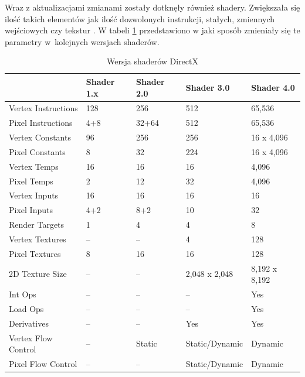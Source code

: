 \documentclass[archive]{mgr}
\begin{document}
Wraz z aktualizacjami zmianami zostały dotknęły również shadery. Zwiększała się ilość takich elementów jak ilość dozwolonych instrukcji, stałych, zmiennych wejściowych czy tekstur \cite{DirectXVersions}. W tabeli \ref{DirectXShaders} przedstawiono w jaki sposób zmieniały się te parametry w~kolejnych wersjach shaderów.

\begin{table}[!h]

    \centering 
    \caption{Wersja shaderów DirectX}
    		\label{DirectXShaders}
    \vspace{2mm} 
\begin{tabular}{|l|l|l|l|l|}
\hline


&\textbf{Shader 1.x}&\textbf{Shader 2.0}&\textbf{Shader 3.0}&\textbf{Shader 4.0}\\ \hline
Vertex Instructions & 128& 256& 512& 65,536\\ \hline
Pixel Instructions& 4+8& 32+64& 512& 65,536\\ \hline
Vertex Constants& 96& 256& 256& 16 x 4,096\\ \hline
Pixel Constants&8& 32& 224 &16 x 4,096\\ \hline
Vertex Temps& 16& 16& 16 &4,096\\ \hline
Pixel Temps& 2& 12& 32 &4,096\\ \hline
Vertex Inputs& 16& 16& 16 &16\\ \hline
Pixel Inputs& 4+2& 8+2& 10 &32\\ \hline
Render Targets& 1& 4& 4& 8\\ \hline
Vertex Textures& –& –& 4 &128\\ \hline
Pixel Textures& 8& 16& 16 &128\\ \hline
2D Texture Size& –& – &2,048 x 2,048& 8,192 x 8,192\\ \hline
Int Ops& –& –& –& Yes\\ \hline
Load Ops& –& –& –& Yes\\ \hline
Derivatives &–& –& Yes &Yes\\ \hline
Vertex Flow Control& –& Static& Static/Dynamic& Dynamic\\ \hline
Pixel Flow Control& –& –& Static/Dynamic& Dynamic\\ \hline

\end{tabular}
\end{table}
\end{document}
